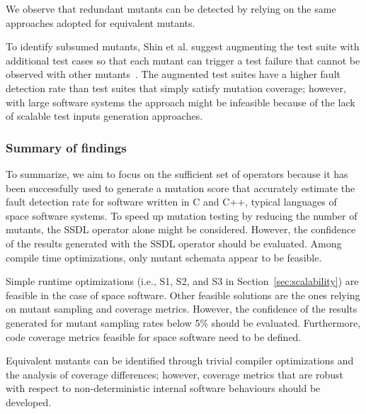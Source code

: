 We observe that redundant mutants can be detected by relying on the same approaches adopted for equivalent mutants. 

To identify subsumed mutants, Shin et al. suggest augmenting the test suite with additional test cases so that each mutant can trigger a test failure that cannot be observed with other mutants~\cite{Shin:TSE:DCriterion:2018}. 
The augmented test suites have a higher
 fault detection rate than test suites that simply satisfy mutation coverage; however, with large software systems the approach might be infeasible because of the lack of scalable test inputs generation approaches.


\subsubsection{Summary of findings}

To summarize, we aim to focus on the sufficient set of operators because it has been successfully used to generate a mutation score that accurately estimate the fault detection rate for software written in C and C++, typical languages of space software systems.
To speed up mutation testing by reducing the number of mutants, the SSDL operator alone might be considered. However, the confidence of the results generated with the SSDL operator should be evaluated.
Among compile time optimizations, only mutant schemata appear to be feasible.

Simple runtime optimizations (i.e., S1, S2, and S3 in Section~\ref{sec:scalability}) are feasible in the case of space software. Other feasible solutions are the ones relying on mutant sampling and coverage metrics. However, the confidence of the results generated for mutant sampling rates below 5\% should be evaluated. Furthermore, code coverage metrics feasible for space software need to be defined.

Equivalent mutants can be identified through trivial compiler optimizations and the analysis of coverage differences; however, coverage metrics that are robust with respect to non-deterministic internal software behaviours should be developed.




